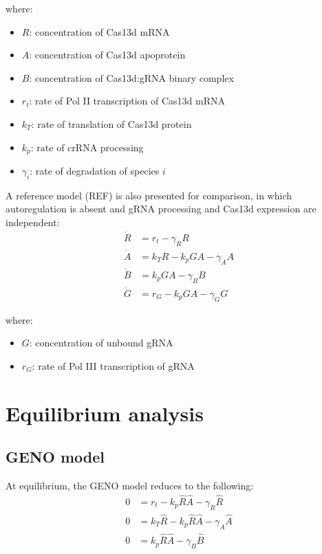 \documentclass[12pt]{article}
\numberwithin{equation}{section}
\begin{document}
\noindent where:
\begin{itemize}[itemsep=0pt]
  \item $R$: concentration of Cas13d mRNA
  \item $A$: concentration of Cas13d apoprotein
  \item $B$: concentration of Cas13d:gRNA binary complex
  \item $r_t$: rate of Pol II transcription of Cas13d mRNA
  \item $k_T$: rate of translation of Cas13d protein
  \item $k_p$: rate of crRNA processing
  \item $\gamma_i$: rate of degradation of species $i$
\end{itemize}

\vspace*{2mm}

\noindent A reference model (REF) is also presented for comparison, in which autoregulation is absent and gRNA processing and Cas13d expression are independent:
\begin{align}
  \dot{R} &= r_t - \gamma_R R\\
  \dot{A} &= k_T R - k_p G A - \gamma_A A\\
  \dot{B} &= k_p G A - \gamma_B B\\
  \dot{G} &= r_G - k_p G A - \gamma_G G
\end{align}

\noindent where:
\begin{itemize}[itemsep=0pt]
  \item $G$: concentration of unbound gRNA
  \item $r_G$: rate of Pol III transcription of gRNA
\end{itemize}

\section{Equilibrium analysis}

\subsection{GENO model}

\noindent At equilibrium, the GENO model reduces to the following:
\begin{align}
  0 &= r_t - k_p \hat{R} \hat{A} - \gamma_R \hat{R} \label{GEeq1}\\
  0 &= k_T \hat{R} - k_p \hat{R} \hat{A} - \gamma_A \hat{A} \label{GEeq2}\\
  0 &= k_p \hat{R} \hat{A} - \gamma_B \hat{B} \label{GEeq3}
\end{align}
\end{document}
